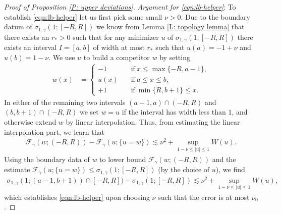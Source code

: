 \documentclass[10pt,a4paper]{amsart}
\begin{document}
\begin{proof}[Proof of Proposition \ref{P: upper deviations}]
			\textit{Argument for \eqref{eqn:lb-helper}}: To establish \eqref{eqn:lb-helper} let us first pick some small $ \nu > 0 $. Due to the boundary datum of $  \sigma_{ 1 , \gamma } ( 1;  [ - R , R ] ) $ we know from Lemma \ref{L: topology lemma} that there exists an $ r_{*} > 0 $ such that for any minimizer $ u $ of $  \sigma_{ 1 , \gamma } ( 1; [ - R , R ] ) $ there exists an interval $ I = [ a, b ] $ of width at most $r_{*}$ such that $ u ( a ) = - 1 + \nu $ and $ u ( b )= 1 - \nu $. We use $ u $ to build a competitor $ w $ by setting
			\begin{align*}
				w ( x ) &= \left\{ \begin{aligned}
					- 1 \quad & \text{if} ~ x \leq \max \{ -R , a - 1 \} , \\
					u ( x ) \quad & \text{if} ~ a \leq x \leq b , \\
					+1 \quad & \text{if} ~ \min \{ R, b + 1 \}  \leq x .
				\end{aligned}\right.
			\end{align*}
			In either of the remaining two intervals $  ( a - 1 , a ) \cap ( - R , R )  $ and $ ( b , b + 1 ) \cap ( - R , R ) $ we set $ w = u $ if the interval has width less than $1$, and otherwise extend $ w $ by linear interpolation. Thus, from estimating the linear interpolation part, we learn that
			\begin{align*}
				\mathscr{F}_{ \gamma } ( w ; ( - R , R ) )
				- \mathscr{F}_{ \gamma } ( u ; \{ u = w \} )
				\lesssim \nu^2 +  \sup_{ 1 - \nu \leq | u | \leq 1 } W ( u ) .
			\end{align*}
			Using the boundary data of  $ w $ to lower bound $ \mathscr{F}_{ \gamma } ( w ; ( - R , R ) ) $ and the estimate $  \mathscr{F}_{ \gamma } ( u ; \{ u = w \} ) \leq \sigma_{ 1 , \gamma } ( 1 ; [ - R , R ] ) $ (by the choice of $ u $), we find
			\begin{align*}
				 \sigma_{ 1 , \gamma } ( 1; ( a - 1 , b + 1 ) ) \cap [ -R , R ] ) 
				 -  \sigma_{ 1 , \gamma } ( 1; [ - R , R ] )
				 \lesssim \nu^2 +  \sup_{ 1 - \nu \leq | u | \leq 1 } W ( u ) ,
			\end{align*}
			which establishes \eqref{eqn:lb-helper} upon choosing $ \nu $ such that the error is at most $ \nu_{0} $.
			

\end{proof}
\end{document}
